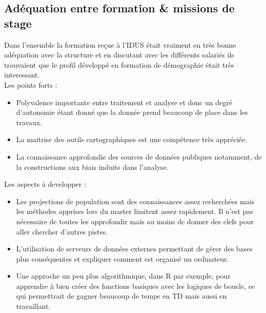 \documentclass{bredele}
\begin{document}
\subsection{Adéquation entre formation \& missions de stage}
Dans l’ensemble la formation reçue à l’IDUS était vraiment en très bonne adéquation avec la structure et en discutant avec les différents salariés ils trouvaient que le profil développé en formation de démographie était très interessant.
\\Les points forts :
\begin{itemize}
	\item Polyvalence importante entre traitement et analyse et donc un degré d’autonomie étant donné que la donnée prend beaucoup de place dans les travaux.
	\item La maitrise des outils cartographiques est une compétence très appréciée.
	\item La connaissance approfondie des sources de données publiques notamment, de la constructions aux biais induits dans l'analyse.\\
\end{itemize}
Les aspects à developper :
\begin{itemize}
	\item Les projections de population sont des connaissances assez recherchées mais les méthodes apprises lors du master limitent assez rapidement. Il n’est pas nécessaire de toutes les approfondir mais au moins de donner des clefs pour aller chercher d’autres pistes.
	\item L'utilisation de serveurs de données externes permettant de gérer des bases plus conséquentes et expliquer comment est organisé un ordinateur.
	\item Une approche un peu plus algorithmique, dans R par exemple, pour apprendre à bien créer des fonctions basiques avec les logiques de boucle, ce qui permettrait de gagner beaucoup de temps en TD mais aussi en travaillant.
\end{itemize}
\end{document}
